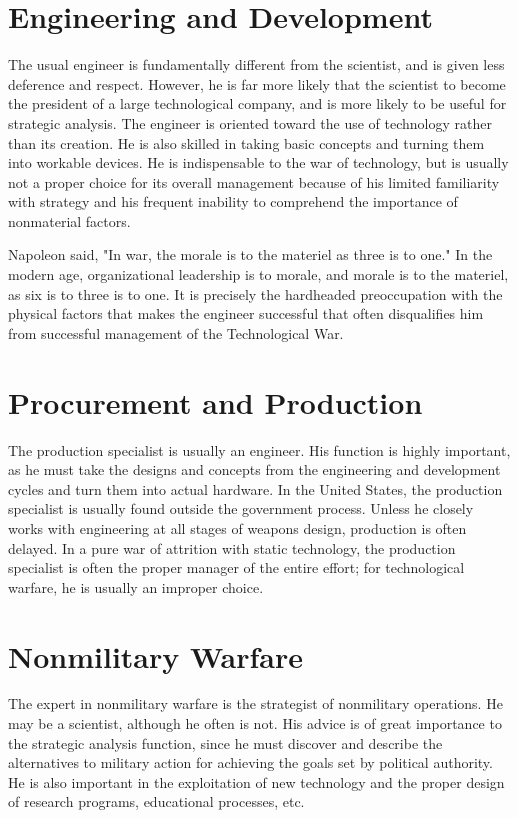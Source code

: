 \section{Engineering and Development}
The usual engineer is fundamentally different from the scientist, and is given less deference and respect. However, he is far more likely that the scientist to become the president of a large technological company, and is more likely to be useful for strategic analysis. The engineer is oriented toward the use of technology rather than its creation. He is also skilled in taking basic concepts and turning them into workable devices. He is indispensable to the war of technology, but is usually not a proper choice for its overall management because of his limited familiarity with strategy and his frequent inability to comprehend the importance of nonmaterial factors.

Napoleon said, "In war, the morale is to the materiel as three is to one." In the modern age, organizational leadership is to morale, and morale is to the materiel, as six is to three is to one. It is precisely the hardheaded preoccupation with the physical factors that makes the engineer successful that often disqualifies him from successful management of the Technological War.

\section{Procurement and Production}
The production specialist is usually an engineer. His function is highly important, as he must take the designs and concepts from the engineering and development cycles and turn them into actual hardware. In the United States, the production specialist is usually found outside the government process. Unless he closely works with engineering at all stages of weapons design, production is often delayed. In a pure war of attrition with static technology, the production specialist is often the proper manager of the entire effort; for technological warfare, he is usually an improper choice.

\section{Nonmilitary Warfare}
The expert in nonmilitary warfare is the strategist of nonmilitary operations. He may be a scientist, although he often is not. His advice is of great importance to the strategic analysis function, since he must discover and describe the alternatives to military action for achieving the goals set by political authority. He is also important in the exploitation of new technology and the proper design of research programs, educational processes, etc.

